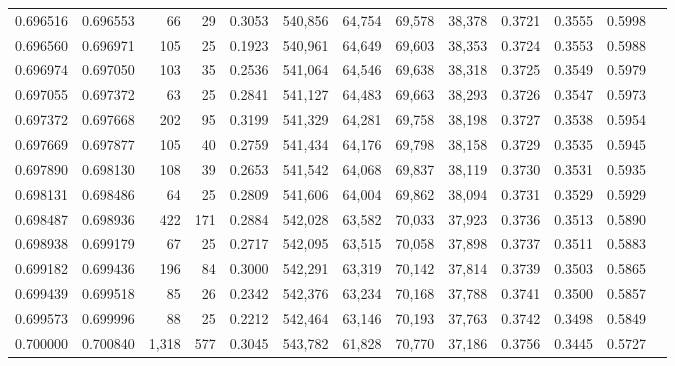 \begin{tabular}{rrrrrrrrrrrrr}
0.696516 & 0.696553 &    66 &  29 &                                     0.3053 & 540,856 &  64,754 &  69,578 &  38,378 & 0.3721 & 0.3555 & 0.5998 \\
0.696560 & 0.696971 &   105 &  25 &                                     0.1923 & 540,961 &  64,649 &  69,603 &  38,353 & 0.3724 & 0.3553 & 0.5988 \\
0.696974 & 0.697050 &   103 &  35 &                                     0.2536 & 541,064 &  64,546 &  69,638 &  38,318 & 0.3725 & 0.3549 & 0.5979 \\
0.697055 & 0.697372 &    63 &  25 &                                     0.2841 & 541,127 &  64,483 &  69,663 &  38,293 & 0.3726 & 0.3547 & 0.5973 \\
0.697372 & 0.697668 &   202 &  95 &                                     0.3199 & 541,329 &  64,281 &  69,758 &  38,198 & 0.3727 & 0.3538 & 0.5954 \\
0.697669 & 0.697877 &   105 &  40 &                                     0.2759 & 541,434 &  64,176 &  69,798 &  38,158 & 0.3729 & 0.3535 & 0.5945 \\
0.697890 & 0.698130 &   108 &  39 &                                     0.2653 & 541,542 &  64,068 &  69,837 &  38,119 & 0.3730 & 0.3531 & 0.5935 \\
0.698131 & 0.698486 &    64 &  25 &                                     0.2809 & 541,606 &  64,004 &  69,862 &  38,094 & 0.3731 & 0.3529 & 0.5929 \\
0.698487 & 0.698936 &   422 & 171 &                                     0.2884 & 542,028 &  63,582 &  70,033 &  37,923 & 0.3736 & 0.3513 & 0.5890 \\
0.698938 & 0.699179 &    67 &  25 &                                     0.2717 & 542,095 &  63,515 &  70,058 &  37,898 & 0.3737 & 0.3511 & 0.5883 \\
0.699182 & 0.699436 &   196 &  84 &                                     0.3000 & 542,291 &  63,319 &  70,142 &  37,814 & 0.3739 & 0.3503 & 0.5865 \\
0.699439 & 0.699518 &    85 &  26 &                                     0.2342 & 542,376 &  63,234 &  70,168 &  37,788 & 0.3741 & 0.3500 & 0.5857 \\
0.699573 & 0.699996 &    88 &  25 &                                     0.2212 & 542,464 &  63,146 &  70,193 &  37,763 & 0.3742 & 0.3498 & 0.5849 \\
0.700000 & 0.700840 & 1,318 & 577 &                                     0.3045 & 543,782 &  61,828 &  70,770 &  37,186 & 0.3756 & 0.3445 & 0.5727 \\

\end{tabular}
